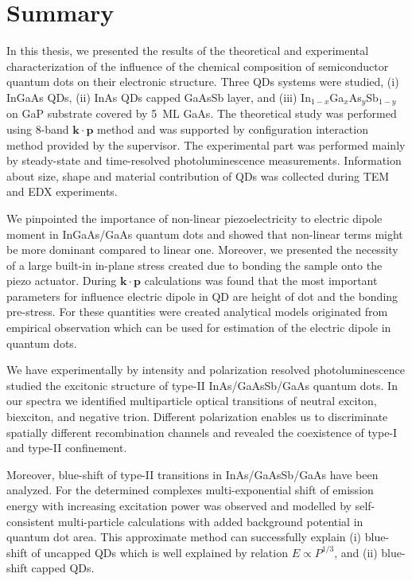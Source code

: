 
\chapter{Summary}\label{chap:summary}

In this thesis, we presented the results of the theoretical and experimental characterization of the influence of the chemical composition of semiconductor quantum dots on their electronic structure. Three QDs systems were studied, (i) InGaAs QDs, (ii) InAs QDs capped GaAsSb layer, and (iii) In$_{1-x}$Ga$_x$As$_y$Sb$_{1-y}$ on GaP substrate covered by 5~ML GaAs. The theoretical study was performed using 8-band $\mathbf{k\cdot p}$ method and was supported by configuration interaction method provided by the supervisor. The experimental part was performed mainly by steady-state and time-resolved photoluminescence measurements. Information about size, shape and material contribution of QDs was collected during TEM and EDX experiments.

We pinpointed the importance of non-linear piezoelectricity to electric dipole moment in InGaAs/GaAs quantum dots and showed that non-linear terms might be more dominant compared to linear one. Moreover, we presented the necessity of a large built-in in-plane stress created due to bonding the sample onto the piezo actuator. During $\mathbf{k\cdot p}$ calculations was found that the most important parameters for influence electric dipole in QD are height of dot and the bonding pre-stress. For these quantities were created analytical models originated from empirical observation which can be used for estimation of the electric dipole in quantum dots.

We have experimentally by intensity and polarization resolved photoluminescence studied the excitonic structure of type-II InAs/GaAsSb/GaAs quantum dots. In our spectra we identified multiparticle optical transitions of neutral exciton, biexciton, and negative trion. Different polarization enables us to discriminate spatially different recombination channels and revealed the coexistence of type-I and type-II confinement.

Moreover, blue-shift of type-II transitions in InAs/GaAsSb/GaAs have been analyzed. For the determined complexes multi-exponential shift of emission energy with increasing excitation power was observed and modelled by self-consistent multi-particle calculations with added background potential in quantum dot area. This approximate method can successfully explain (i) blue-shift of uncapped QDs which is well explained by relation $E\propto P^{1/3}$, and (ii) blue-shift capped QDs.

